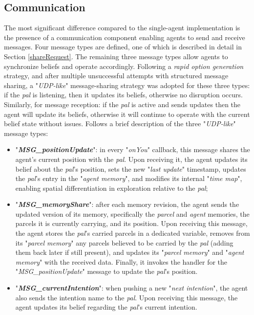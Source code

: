         
    \subsection{Communication}            
        The most significant difference compared to the single-agent implementation is the presence of a communication component enabling agents to send and receive messages. Four message types are defined, one of which is described in detail in Section \ref{shareRequest}. The remaining three message types allow agents to synchronize beliefs and operate accordingly. Following a \textit{rapid option generation} strategy, and after multiple unsuccessful attempts with structured message sharing, a "\textit{UDP-like}" message-sharing strategy was adopted for these three types: if the \textit{pal} is listening, then it updates its beliefs, otherwise no disruption occurs. Similarly, for message reception: if the \textit{pal} is active and sends updates then the agent will update its beliefs, otherwise it will continue to operate with the current belief state without issues. Follows a brief description of the three "\textit{UDP-like}" message types:
        \begin{itemize}
            \item "\textbf{\textit{MSG\_positionUpdate}}": in every "\textit{onYou}" callback, this message shares the agent's current position with the \textit{pal}. Upon receiving it, the agent updates its belief about the \textit{pal}'s position, sets the new "\textit{last update}" timestamp, updates the \textit{pal}'s entry in the "\textit{agent memory}", and modifies its internal "\textit{time map}", enabling spatial differentiation in exploration relative to the \textit{pal};                    
            \item "\textbf{\textit{MSG\_memoryShare}}": after each memory revision, the agent sends the updated version of its memory, specifically the \textit{parcel} and \textit{agent} memories, the parcels it is currently carrying, and its position. Upon receiving this message, the agent stores the \textit{pal}'s carried parcels in a dedicated variable, removes from its "\textit{parcel memory}" any parcels believed to be carried by the \textit{pal} (adding them back later if still present), and updates its "\textit{parcel memory}" and "\textit{agent memory}" with the received data. Finally, it invokes the handler for the "\textit{MSG\_positionUpdate}" message to update the \textit{pal}'s position.
            \item "\textbf{\textit{MSG\_currentIntention}}": when pushing a new "\textit{next intention}", the agent also sends the intention name to the \textit{pal}. Upon receiving this message, the agent updates its belief regarding the \textit{pal}'s current intention.
        \end{itemize}
        
